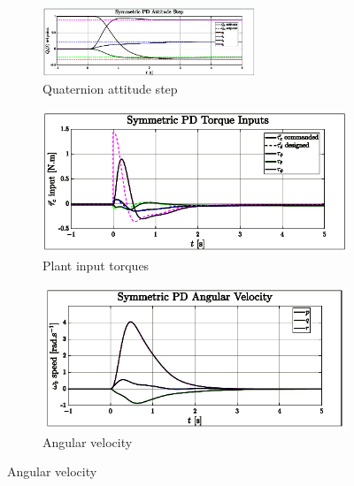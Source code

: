 \begin{figure}[htbp]
\vspace{-10pt}
\centering
\begin{subfigure}{\textwidth}
\centering
\includegraphics[width=0.7\textwidth]{graphs/PD_3x3_Dependent_Step}
\vspace{-6pt}
\caption{Quaternion attitude step}
\label{fig:PD_3x3_Dependent_Step}
\end{subfigure}
\begin{subfigure}{0.49\textwidth}
\centering
\includegraphics[width=\textwidth]{graphs/PD_3x3_Dependent_Torque}
\vspace{-20pt}
\caption{Plant input torques}
\label{fig:PD_3x3_Dependent_Torque}
\end{subfigure}
\begin{subfigure}{0.49\textwidth}
\centering
\includegraphics[width=\textwidth]{graphs/PD_3x3_Dependent_Angular}
\vspace{-20pt}
\caption{Angular velocity}
\label{fig:PD_3x3_Dependent_Angular}

\end{subfigure}
\end{figure}
